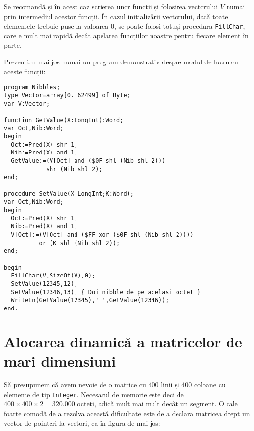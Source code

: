 Se recomandă și în acest caz scrierea unor funcții și folosirea vectorului $V$
numai prin intermediul acestor funcții. În cazul inițializării vectorului,
dacă toate elementele trebuie puse la valoarea 0, se poate folosi totuși
procedura {\tt FillChar}, care e mult mai rapidă decât apelarea funcțiilor
noastre pentru fiecare element în parte.

Prezentăm mai jos numai un program demonstrativ despre modul de lucru cu
aceste funcții:

\begin{verbatim}
program Nibbles;
type Vector=array[0..62499] of Byte;
var V:Vector;

function GetValue(X:LongInt):Word;
var Oct,Nib:Word;
begin
  Oct:=Pred(X) shr 1;
  Nib:=Pred(X) and 1;
  GetValue:=(V[Oct] and ($0F shl (Nib shl 2)))
            shr (Nib shl 2);
end;

procedure SetValue(X:LongInt;K:Word);
var Oct,Nib:Word;
begin
  Oct:=Pred(X) shr 1;
  Nib:=Pred(X) and 1;
  V[Oct]:=(V[Oct] and ($FF xor ($0F shl (Nib shl 2))))
          or (K shl (Nib shl 2));
end;

begin
  FillChar(V,SizeOf(V),0);
  SetValue(12345,12);
  SetValue(12346,13); { Doi nibble de pe acelasi octet }
  WriteLn(GetValue(12345),' ',GetValue(12346));
end.
\end{verbatim}

\section{Alocarea dinamică a matricelor de mari dimensiuni}

Să presupunem că avem nevoie de o matrice cu 400 linii și 400 coloane cu
elemente de tip {\tt Integer}. Necesarul de memorie este deci de $400 \times
400 \times 2 = 320.000$ octeți, adică mult mai mult decât un segment. O cale
foarte comodă de a rezolva această dificultate este de a declara matricea
drept un vector de pointeri la vectori, ca în figura de mai jos:

